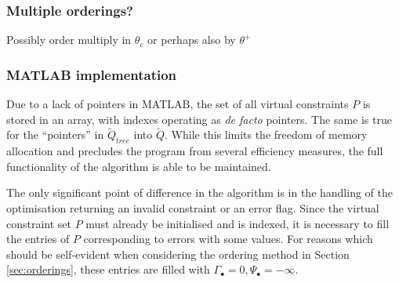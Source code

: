 {\color{red}\subsubsection{Multiple orderings?}
Possibly order multiply in $\theta_c$ or perhaps also by $\theta^+$}

\subsubsection{MATLAB implementation}
Due to a lack of pointers in MATLAB, the set of all virtual constraints $P$ is stored in an array, with indexes operating as \textit{de facto} pointers. The same is true for the ``pointers'' in $\tilde{Q}_{tree}$ into $\tilde{Q}$. While this limits the freedom of memory allocation and precludes the program from several efficiency measures, the full functionality of the algorithm is able to be maintained.

The only significant point of difference in the algorithm is in the handling of the optimisation returning an invalid constraint or an error flag. Since the virtual constraint set $P$ must already be initialised and is indexed, it is necessary to fill the entries of $P$ corresponding to errors with some values. For reasons which should be self-evident when considering the ordering method in Section \ref{sec:orderings}, these entries are filled with $\Gamma_\bullet = 0, \Psi_\bullet=-\infty$.
